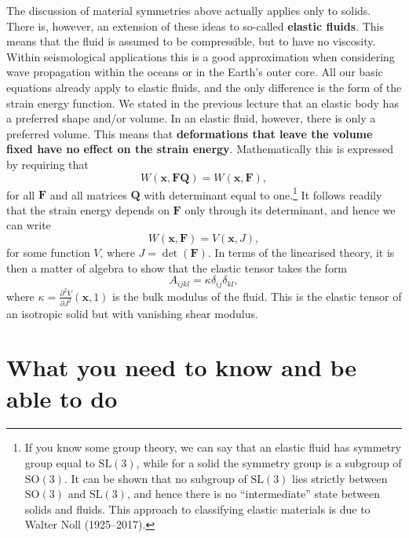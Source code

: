 The discussion of material symmetries above actually applies only to solids. There is, however, an 
extension of these ideas to so-called \textbf{elastic fluids}. This means that the fluid is assumed to be compressible, 
but to have no viscosity. Within seismological applications this is a good approximation when considering wave propagation within 
the oceans or in the Earth's outer core. All our basic equations already apply to elastic fluids, and the only difference 
is the form of the strain energy function. We stated in the previous lecture that an elastic body has a preferred shape 
and/or volume. In an elastic fluid, however, there is only a preferred volume. This means that \textbf{deformations that leave the 
volume fixed have no effect on the strain energy}. Mathematically this is expressed by requiring that
\begin{equation}
W(\mathbf{x}, \mathbf{F}\mathbf{Q}) = W(\mathbf{x}, \mathbf{F}),
\label{eq:46}
\end{equation}
for all $\mathbf{F}$ and all matrices $\mathbf{Q}$ with determinant equal to one.\footnote{If you know some group theory, we can say that an elastic fluid has symmetry group equal to $\mathrm{SL}(3)$, while for a solid the symmetry group is a subgroup of $\mathrm{SO}(3)$. It can be shown that no subgroup of $\mathrm{SL}(3)$ lies strictly between $\mathrm{SO}(3)$ and $\mathrm{SL}(3)$, and hence there is no ``intermediate'' state between solids and fluids. This approach to classifying elastic materials is due to Walter Noll (1925--2017).} It follows readily that the strain energy depends on $\mathbf{F}$ only through its determinant, and hence we can write
\begin{equation}
W(\mathbf{x}, \mathbf{F}) = V(\mathbf{x}, J),
\label{eq:47}
\end{equation}
for some function $V$, where $J = \det(\mathbf{F})$. In terms of the linearised theory, it is then a matter of algebra to show that the elastic tensor takes the form
\begin{equation}
A_{ijkl} = \kappa\delta_{ij}\delta_{kl},
\label{eq:48}
\end{equation}
where $\kappa = \frac{\partial^{2}V}{\partial J^{2}}(\mathbf{x}, 1)$ is the bulk modulus of the fluid. This is the elastic tensor of an isotropic solid but with vanishing shear modulus.

\section*{What you need to know and be able to do}

